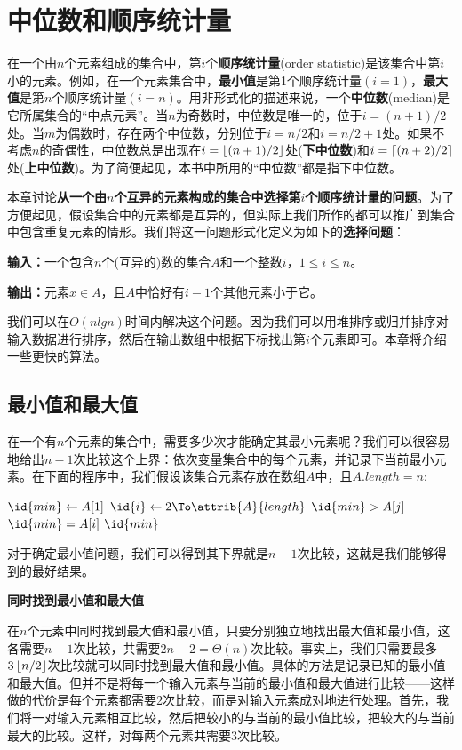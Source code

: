 \documentclass[a4paper,11pt]{ctexbook}
\begin{document}
\setcounter{chapter}{8}

\chapter{中位数和顺序统计量}
在一个由$n$个元素组成的集合中，第$ i $个\textbf{顺序统计量}(order statistic)是该集合中第$ i $小的元素。例如，在一个元素集合中，\textbf{最小值}是第1个顺序统计量$ (i = 1) $，\textbf{最大值}是第$ n $个顺序统计量$ (i=n)$。用非形式化的描述来说，一个\textbf{中位数}(median)是它所属集合的“中点元素”。当$ n $为奇数时，中位数是唯一的，位于$ i = (n+1)/2 $处。当$ m $为偶数时，存在两个中位数，分别位于$ i=n/2 $和$ i=n/2+1 $处。如果不考虑$ n $的奇偶性，中位数总是出现在$ i=\left\lfloor (n+1)/2 \right\rfloor $处(\textbf{下中位数})和$ i=\lceil (n+2)/2 \rceil $处(\textbf{上中位数})。为了简便起见，本书中所用的“中位数”都是指下中位数。

本章讨论\textbf{从一个由$ n $个互异的元素构成的集合中选择第$ i $个顺序统计量的问题}。为了方便起见，假设集合中的元素都是互异的，但实际上我们所作的都可以推广到集合中包含重复元素的情形。我们将这一问题形式化定义为如下的\textbf{选择问题}：

\textbf{输入：}一个包含$ n $个(互异的)数的集合$ A $和一个整数$ i $，$ 1\leq i \leq n $。

\textbf{输出：}元素$ x \in A $，且$ A $中恰好有$ i-1 $个其他元素小于它。

我们可以在$ O(nlgn) $时间内解决这个问题。因为我们可以用堆排序或归并排序对输入数据进行排序，然后在输出数组中根据下标找出第$ i $个元素即可。本章将介绍一些更快的算法。
\section{最小值和最大值}
在一个有$ n $个元素的集合中，需要多少次才能确定其最小元素呢？我们可以很容易地给出$ n-1 $次比较这个上界：依次变量集合中的每个元素，并记录下当前最小元素。在下面的程序中，我们假设该集合元素存放在数组$ A $中，且$ A.length=n $:
\begin{codebox}
	\li $ \id{min} \gets A[1] $
	\li \For $  \id{i} \gets 2 \To \attrib{A}{length} $
	\li  \Do
		  \If $ \id{min} > A[j] $
	\li    \Then 
		    $ \id{min} = A[i] $
		   \End
		 \End
   \li \Return $ \id{min} $
\end{codebox}

对于确定最小值问题，我们可以得到其下界就是$ n-1 $次比较，这就是我们能够得到的最好结果。

\textbf{同时找到最小值和最大值}

在$ n $个元素中同时找到最大值和最小值，只要分别独立地找出最大值和最小值，这各需要$ n-1 $次比较，共需要$ 2n-2 = \Theta(n)$次比较。事实上，我们只需要最多$ 3\left\lfloor n/2 \right\rfloor $次比较就可以同时找到最大值和最小值。具体的方法是记录已知的最小值和最大值。但并不是将每一个输入元素与当前的最小值和最大值进行比较——这样做的代价是每个元素都需要2次比较，而是对输入元素成对地进行处理。首先，我们将一对输入元素相互比较，然后把较小的与当前的最小值比较，把较大的与当前最大的比较。这样，对每两个元素共需要3次比较。
\end{document}
